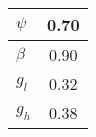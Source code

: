 \begin{tiny}\begin{tabular}{|l|c|}
\hline
\textbf{$\psi$}&0.70\\\hline
\textbf{$\beta$}&0.90\\\hline
\textbf{$g_{l}$}&0.32\\\hline
\textbf{$g_{h}$}&0.38\\\hline
\end{tabular}
\end{tiny}